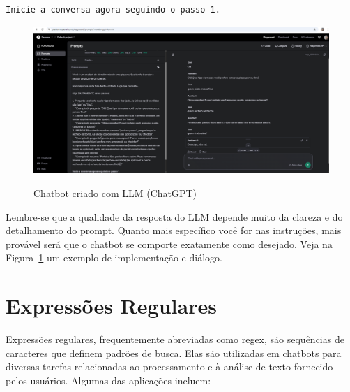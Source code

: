 \documentclass[14pt,a4paper,oneside]{book}
\begin{document}
\begin{lstlisting}[language=Tex]
Inicie a conversa agora seguindo o passo 1.
\end{lstlisting}

\vspace{\baselineskip}

\begin{figure}[!htbp]
	\centering
	\caption{Chatbot criado com LLM (ChatGPT)}
	\includegraphics[width=1\linewidth]{fig/chat_chatgpt_pizza.png}
	\label{fig:chat_chatgpt_pizza}
\end{figure}

Lembre-se que a qualidade da resposta do LLM depende muito da clareza e do detalhamento do prompt. Quanto mais específico você for nas instruções, mais provável será que o chatbot se comporte exatamente como desejado. Veja na Figura~\ref{fig:chat_chatgpt_pizza} um exemplo de implementação e diálogo.


\chapter{Expressões Regulares}

Expressões regulares, frequentemente abreviadas como regex, são sequências de caracteres que definem padrões de busca. Elas são utilizadas em chatbots para diversas tarefas relacionadas ao processamento e à análise de texto fornecido pelos usuários. Algumas das aplicações incluem:
\end{document}
